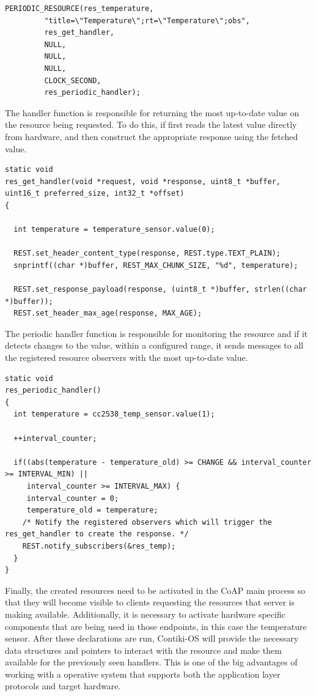 \begin{lstlisting}
PERIODIC_RESOURCE(res_temperature,
         "title=\"Temperature\";rt=\"Temperature\";obs",
         res_get_handler,
         NULL,
         NULL,
         NULL,
         CLOCK_SECOND,
         res_periodic_handler);
\end{lstlisting}

The handler function is responsible for returning the most up-to-date value on the resource being requested. To do this, if first reads the latest value directly from hardware, and then construct the appropriate response using the fetched value.

\begin{lstlisting}
static void
res_get_handler(void *request, void *response, uint8_t *buffer, uint16_t preferred_size, int32_t *offset)
{

  int temperature = temperature_sensor.value(0);

  REST.set_header_content_type(response, REST.type.TEXT_PLAIN);
  snprintf((char *)buffer, REST_MAX_CHUNK_SIZE, "%d", temperature);

  REST.set_response_payload(response, (uint8_t *)buffer, strlen((char *)buffer));
  REST.set_header_max_age(response, MAX_AGE);
\end{lstlisting}

The periodic handler function is responsible for monitoring the resource and if it detects changes to the value, within a configured range, it sends messages to all the registered resource observers with the most up-to-date value.

\begin{lstlisting}
static void
res_periodic_handler()
{
  int temperature = cc2538_temp_sensor.value(1);

  ++interval_counter;

  if((abs(temperature - temperature_old) >= CHANGE && interval_counter >= INTERVAL_MIN) || 
     interval_counter >= INTERVAL_MAX) {
     interval_counter = 0;
     temperature_old = temperature;
    /* Notify the registered observers which will trigger the res_get_handler to create the response. */
    REST.notify_subscribers(&res_temp);
  }
}
\end{lstlisting}

Finally, the created resources need to be activated in the \gls{CoAP} main process so that they will become visible to clients requesting the resources that server is making available. Additionally, it is necessary to activate hardware specific components that are being used in those endpoints, in this case the temperature sensor. After these declarations are run, Contiki-OS will provide the necessary data structures and pointers to interact with the resource and make them available for the previously seen handlers. This is one of the big advantages of working with a operative system that supports both the application layer protocols and target hardware.

